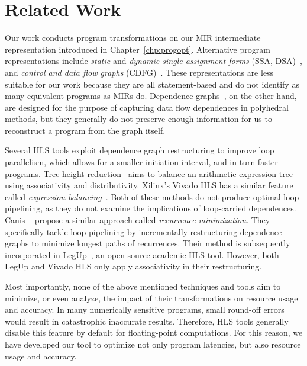 \section{Related Work}
\label{sec:related_work}

Our work conducts program transformations on our MIR intermediate
representation introduced in Chapter~\ref{chp:progopt}. Alternative program
representations include \emph{static} and \emph{dynamic single assignment
forms} (SSA, DSA)~\cite{rau92, cytron91}, and \emph{control and data flow
graphs} (CDFG)~\cite{gajski94}. These representations are less suitable for
our work because they are all statement-based and do not identify as many
equivalent programs as MIRs do. Dependence graphs~\cite{rau94}, on the other
hand, are designed for the purpose of capturing data flow dependences in
polyhedral methods, but they generally do not preserve enough information for
us to reconstruct a program from the graph itself.

Several HLS tools exploit dependence graph restructuring to improve loop
parallelism, which allows for a smaller initiation interval, and in turn faster
programs.  Tree height reduction~\cite{nicolau91} aims to balance an arithmetic
expression tree using associativity and distributivity. Xilinx's Vivado HLS has
a similar feature called \emph{expression balancing}~\cite{vivado_hls}.  Both
of these methods do not produce optimal loop pipelining, as they do not examine
the implications of loop-carried dependences.  Canis \etal~\cite{canis14}
propose a similar approach called \emph{recurrence minimization}. They
specifically tackle loop pipelining by incrementally restructuring dependence
graphs to minimize longest paths of recurrences. Their method is subsequently
incorporated in LegUp~\cite{legup}, an open-source academic HLS tool.  However,
both LegUp and Vivado HLS only apply associativity in their restructuring.

Most importantly, none of the above mentioned techniques and tools aim to
minimize, or even analyze, the impact of their transformations on resource
usage and accuracy. In many numerically sensitive programs, small round-off
errors would result in catastrophic inaccurate results. Therefore, HLS tools
generally disable this feature by default for floating-point computations. For
this reason, we have developed our tool to optimize not only program latencies,
but also resource usage and accuracy.

